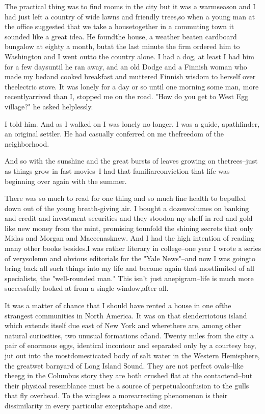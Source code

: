 \documentclass[12pt,a4paper]{report}
\begin{document}
The practical thing was to find rooms in the city but it was a warmseason and I had just left a country of wide lawns and friendly trees,so when a young man at the office suggested that we take a housetogether in a commuting town it sounded like a great idea. He foundthe house, a weather beaten cardboard bungalow at eighty a month, butat the last minute the firm ordered him to Washington and I went outto the country alone. I had a dog, at least I had him for a few daysuntil he ran away, and an old Dodge and a Finnish woman who made my bedand cooked breakfast and muttered Finnish wisdom to herself over theelectric stove.
It was lonely for a day or so until one morning some man, more recentlyarrived than I, stopped me on the road.
"How do you get to West Egg village?" he asked helplessly.

I told him. And as I walked on I was lonely no longer. I was a guide, apathfinder, an original settler. He had casually conferred on me thefreedom of the neighborhood.

And so with the sunshine and the great bursts of leaves growing on thetrees--just as things grow in fast movies--I had that familiarconviction that life was beginning over again with the summer.

There was so much to read for one thing and so much fine health to bepulled down out of the young breath-giving air. I bought a dozenvolumes on banking and credit and investment securities and they stoodon my shelf in red and gold like new money from the mint, promising tounfold the shining secrets that only Midas and Morgan and Maecenasknew. And I had the high intention of reading many other books besides.I was rather literary in college--one year I wrote a series of verysolemn and obvious editorials for the "Yale News"--and now I was goingto bring back all such things into my life and become again that mostlimited of all specialists, the "well-rounded man." This isn't just anepigram--life is much more successfully looked at from a single window,after all.

It was a matter of chance that I should have rented a house in one ofthe strangest communities in North America. It was on that slenderriotous island which extends itself due east of New York and wherethere are, among other natural curiosities, two unusual formations ofland. Twenty miles from the city a pair of enormous eggs, identical incontour and separated only by a courtesy bay, jut out into the mostdomesticated body of salt water in the Western Hemisphere, the greatwet barnyard of Long Island Sound. They are not perfect ovals--like theegg in the Columbus story they are both crushed flat at the contactend--but their physical resemblance must be a source of perpetualconfusion to the gulls that fly overhead. To the wingless a morearresting phenomenon is their dissimilarity in every particular exceptshape and size.
\end{document}
